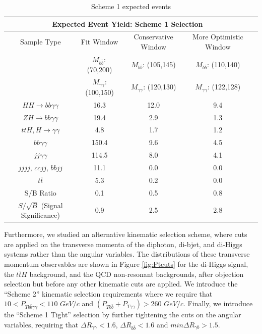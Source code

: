 \documentclass{cmspaper}
\begin{document}
\begin{table}[!ht]
\begin{center}
\begin{tabular}{|c|c|c|c|c|}
\hline
\multicolumn{4}{|c|}{\textbf{Expected Event Yield: Scheme 1 Selection}}                                 \\ \hline
Sample Type & Fit Window                    & Conservative Window           & More Optimistic Window    \\ 
            & $M_{b\bar{b}}:$ (70,200)      & $M_{b\bar{b}}$: (105,145)     & $M_{b\bar{b}}$: (110,140)      \\ 
            & $M_{\gamma\gamma}$: (100,150) & $M_{\gamma\gamma}$: (120,130) & $M_{\gamma\gamma}$: (122,128)  \\ 
\hline
$HH\rightarrow bb\gamma\gamma$     & 16.3     & 12.0     & 9.4       \\ \hline
$ZH\rightarrow bb \gamma\gamma$    & 19.4     & 2.9      & 1.3       \\ 
$ttH,H\rightarrow\gamma\gamma$     & 4.8      & 1.7      & 1.2       \\ 
$bb\gamma\gamma$                   & 150.4    & 9.6      & 4.5       \\ 
$jj\gamma\gamma$                   & 114.5    & 8.0      & 4.1       \\ 
$jjjj$, $ccjj$, $bbjj$             & 11.1     & 0.0      & 0.0       \\ 
$t\bar{t}$                         & 5.3      & 0.2      & 0.0       \\ \hline
S/B Ratio                          & 0.1      & 0.5      & 0.8       \\ \hline
$S/\sqrt{B}$ (Signal Significance) & 0.9      & 2.5      & 2.8       \\ \hline
\end{tabular}
\caption{Scheme 1 expected events}
\label{tab:scheme1_events}
\end{center}
\end{table}

Furthermore, we studied an alternative kinematic selection scheme, where cuts are applied
on the transverse momenta of the diphoton, di-bjet, and di-Higgs systems rather than the angular variables.
The distributions of these transverse momentum observables are shown in Figure \ref{fig:Ptcuts} for the 
di-Higgs signal, the  $t\bar{t}H$ background, and the QCD non-resonant backgrounds, after objection
selection but before any other kinematic cuts are applied. We introduce the ``Scheme 2'' 
kinematic selection requirements where we require that $10 < P_{Tb\bar{b}\gamma\gamma} < 110$ $GeV/c$ 
and $(P_{Tb\bar{b}}+P_{T\gamma\gamma})>260$ $GeV/c$. 
Finally, we introduce the ``Scheme 1 Tight'' selection by further tightening the 
cuts on the angular variables, requiring that $\Delta R_{\gamma\gamma} < 1.6$, 
$\Delta R_{b\bar{b}}<1.6$ and $min\Delta R_{\gamma b} > 1.5$. 
\end{document}

